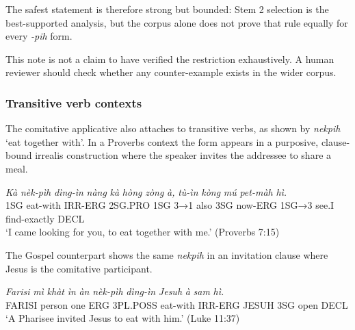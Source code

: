 \documentclass[
  11pt,
  a4paper,
]{article}
\newcommand{\tdim}[1]{\textit{#1}}
\newcommand{\tdimword}[1]{\textit{#1}}
\renewcommand{\textsc}[1]{{\footnotesize\MakeUppercase{#1}}}
\newcommand{\glossquote}[1]{`#1'}
\begin{document}
The safest statement is therefore strong but bounded: Stem 2 selection
is the best-supported analysis, but the corpus alone does not prove that
rule equally for every \tdim{-pih} form.

This note is not a claim to have verified the restriction exhaustively.
A human reviewer should check whether any counter-example exists in the
wider corpus.

\subsubsection{Transitive verb contexts}\label{transitive-verb-contexts}

The comitative applicative also attaches to transitive verbs, as shown
by \tdim{nekpih} \glossquote{eat together with}. In a Proverbs context
the form appears in a purposive, clause-bound irrealis construction
where the speaker invites the addressee to share a meal.

\begin{exe}
\ex \label{ex:pih-trans-nekpih-prov7}
\gll \tdimword{Kà} \tdimword{nèk-pìh} \tdimword{dìng-ìn} \tdimword{nàng} \tdimword{kà} \tdimword{hòng} \tdimword{zòng} \tdimword{à,} \tdimword{tù-ìn} \tdimword{kòng} \tdimword{mú} \tdimword{pet-màh} \tdimword{hì.} \\
     \textsc{1sg} eat-with \textsc{irr}-\textsc{erg} \textsc{2sg}.\textsc{pro} \textsc{1sg} \textsc{3→1} also \textsc{3sg} now-\textsc{erg} \textsc{1sg→3} see.\textsc{i} find-exactly \textsc{decl} \\
\glt \glossquote{I came looking for you, to eat together with me.} (Proverbs 7:15)
\end{exe}

The Gospel counterpart shows the same \tdim{nekpih} in an invitation
clause where Jesus is the comitative participant.

\begin{exe}
\ex \label{ex:pih-trans-nekpih-luke11}
\gll \tdimword{Farisi} \tdimword{mì} \tdimword{khàt} \tdimword{ìn} \tdimword{àn} \tdimword{nèk-pìh} \tdimword{dìng-ìn} \tdimword{Jesuh} \tdimword{à} \tdimword{sam} \tdimword{hì.} \\
     \textsc{farisi} person one \textsc{erg} \textsc{3pl}.\textsc{poss} eat-with \textsc{irr}-\textsc{erg} \textsc{jesuh} \textsc{3sg} open \textsc{decl} \\
\glt \glossquote{A Pharisee invited Jesus to eat with him.} (Luke 11:37)
\end{exe}
\end{document}

